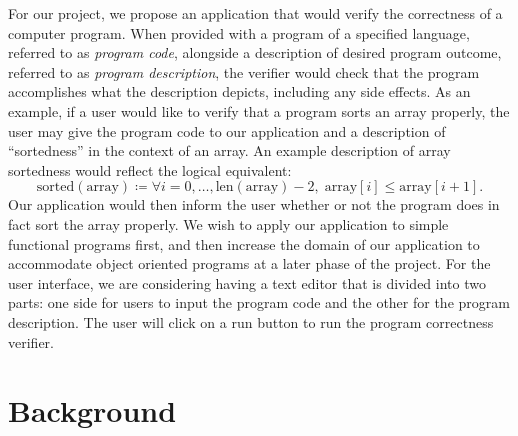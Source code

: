 \documentclass[ 12pt ]{article}
\begin{document}
\qquad For our project, we propose an application that would verify the correctness of a computer  program. When provided with a program of a specified language, referred to as \textit{program code}, alongside a description of desired program outcome, referred to as \textit{program description}, the verifier would check that the program accomplishes what the description depicts, including any side effects. As an example, if a user would like to verify that a program sorts an array properly, the user may give the program code to our application and a description of “sortedness” in the context of an array. An example description of array sortedness would reflect the logical equivalent: $$\mathrm{sorted}(\mathrm{array}) \coloneqq \forall i=0, \hdots, \mathrm{len}( \mathrm{array} ) - 2,\; \mathrm{array}[ i ] \leq \mathrm{array}[ i + 1 ].$$ Our application would then inform the user whether or not the program does in fact sort the array properly. We wish to apply our application to simple functional programs first, and then increase the domain of our application to accommodate object oriented programs at a later phase of the project. For the user interface, we are considering having a text editor that is divided into two parts: one side for users to input the program code and the other for the program description. The user will click on a run button to run the program correctness verifier.


\section*{Background}
\end{document}
